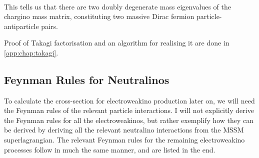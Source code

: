 \documentclass[../main.tex]{subfiles}
\begin{document}
\begin{align}
\end{align}
This tells us that there are two doubly degenerate mass eigenvalues of the chargino mass matrix, constituting two massive Dirac fermion particle-antiparticle pairs.

Proof of Takagi factorisation and an algorithm for realising it are done in \cref{app:chap:takagi}.




\subsection{Feynman Rules for Neutralinos}
\label{susy:sec:feynman_rules}
To calculate the cross-section for electroweakino production later on, we will need the Feynman rules of the relevant particle interactions.
I will not explicitly derive the Feynman rules for all the electroweakinos, but rather exemplify how they can be derived by deriving all the relevant neutralino interactions from the MSSM superlagrangian.
The relevant Feynman rules for the remaining electroweakino processes follow in much the same manner, and are listed in the end.
\end{document}
